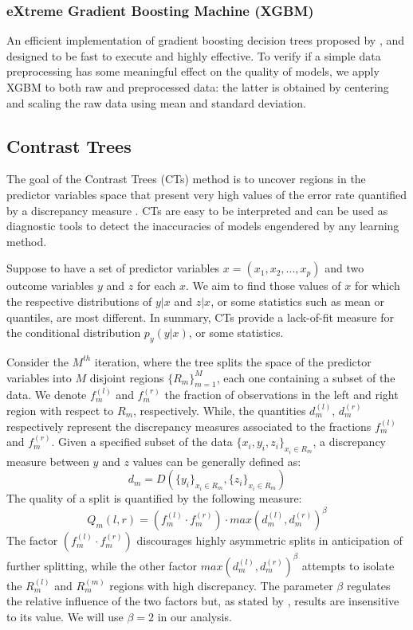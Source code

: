 \documentclass[fleqn,10pt]{wlscirep}
\begin{document}
\subsubsection*{eXtreme Gradient Boosting Machine (XGBM)}
An efficient implementation of gradient boosting decision trees proposed by \cite{Chen}, and designed to be fast to execute and highly effective. To verify if a simple data preprocessing has some meaningful effect on the quality of models, we apply XGBM to both raw and preprocessed data: the latter is obtained by centering and scaling the raw data using mean and standard deviation.

\subsection*{Contrast Trees}

The goal of the Contrast Trees (CTs) method is to uncover regions in the predictor variables space that present very high values of the error rate quantified by a discrepancy measure \cite{Friedman2020}.
CTs are easy to be interpreted and can be used as diagnostic tools to detect the inaccuracies of models engendered by any learning method. 

Suppose to have a set of predictor variables $x = (x_1, x_2,...,x_p)$ and two outcome variables $y$ and $z$ for each $x$. We aim to find those values of $x$ for which the respective distributions of $y | x$ and $z | x$, or some statistics such as mean or quantiles, are most different. In summary, CTs provide a lack-of-fit measure for the conditional distribution $p_y(y | x)$, or some statistics.

Consider the $M^{th}$ iteration, where the tree splits the space of the predictor variables into $M$ disjoint regions $\lbrace R_m\rbrace^M_{m=1}$, each one containing a subset of the data. We denote $f_m^{(l)}$ and $f_m^{(r)}$ the fraction of observations in the left and right region with respect to $R_m$, respectively. While, the quantities $d_m^{(l)}$, $d_m^{(r)}$ respectively represent the discrepancy measures associated to the fractions $f_m^{(l)}$ and $f_m^{(r)}$. Given a specified subset of the data $\lbrace x_i,y_i,z_i \rbrace_{x_i\in R_m}$, a discrepancy measure between $y$ and $z$ values can be generally defined as:
\begin{equation}
\label{eq:dm}
d_m=D\left( \lbrace y_i\rbrace_{x_i\in R_m},\lbrace z_i\rbrace_{x_i\in R_m}\right)
\end{equation}
The quality of a split is quantified by the following measure:
\begin{equation}
Q_m(l,r)=\left(f_m^{(l)} \cdot f_m^{(r)}\right) \cdot max\left(d_m^{(l)}, d_m^{(r)} \right)^{\beta}
\end{equation}
The factor $\left(f_m^{(l)} \cdot f_m^{(r)}\right)$ discourages highly asymmetric splits in anticipation of further splitting, while the other factor $max\left(d_m^{(l)}, d_m^{(r)} \right)^{\beta}$ attempts to isolate the $R_m^{(l)}$ and $R_m^{(m)}$ regions with high discrepancy. The parameter $\beta$ regulates the relative influence of the two factors but, as stated by \cite{Friedman2020}, results are insensitive to its value. We will use $\beta=2$ in our analysis.
\end{document}
